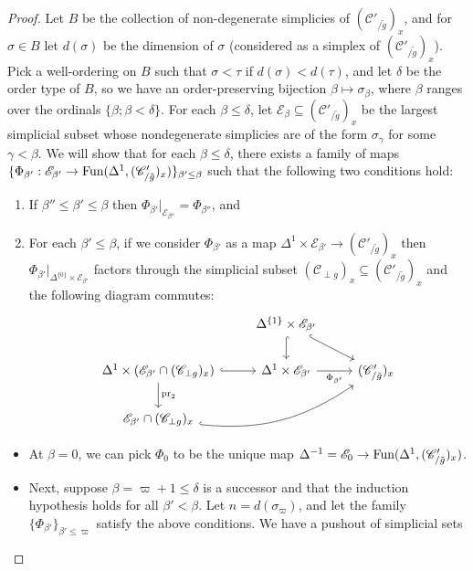 \documentclass{tac}
\newcommand{\s}[1]{\mathscr{#1}}
\newcommand{\tx}[1]{\textnormal{#1}}
\begin{document}
\begin{proof}
\hfill

Let $B$ be the collection of non-degenerate simplicies of $(\s{C}'_{/ \tilde{g}})_x$, and for $\sigma \in B$ let $d(\sigma )$ be the dimension of $\sigma$ (considered as a simplex of  $(\s{C}'_{/ \tilde{g}})_x$).  Pick a well-ordering on $B$ such that $\sigma <\tau$ if $d(\sigma) < d(\tau)$, and let $\delta$ be the order type of $B$, so we have an order-preserving bijection $\beta \mapsto \sigma_\beta$, where $\beta$ ranges over the ordinals $\{\beta ; \beta <\delta \}$.  For each $\beta\leq \delta$, let $\s{E}_\beta \subseteq (\s{C}'_{/ \tilde{g}})_x$ be the largest simplicial subset whose nondegenerate simplicies are of the form $\sigma_{\gamma}$ for some $\gamma < \beta$.  We will show that for each $\beta \leq \delta$, there exists a family of maps $\{ \Phi_{\beta'} : \s{E}_{\beta'} \to \tx{Fun}(\Delta^1 , (\s{C}'_{/ \tilde{g}})_x) \}_{\beta' \leq \beta}$ such that the following two conditions hold: 
\begin{enumerate}[label=\arabic*'.]
\item\label{cohnultriangleprop1prime} If $\beta'' \leq \beta' \leq \beta$ then $\Phi_{\beta'} |_{\s{E}_{\beta''}} = \Phi_{\beta''}$, and 
\item\label{cohnultriangleprop2prime} For each $\beta' \leq \beta$, if we consider $\Phi_{\beta'}$ as a map $\Delta^1 \times \s{E}_{\beta'} \to (\s{C}'_{/\tilde{g}})_x$ then $\Phi_{\beta'} |_{\Delta^{\{0\}} \times \s{E}_{\beta'}}$ factors through the simplicial subset $(\s{C}_{\perp g})_x \subseteq  (\s{C}'_{/\tilde{g}})_x $ and the following diagram commutes:
\begin{equation}\label{cohnultrianglepropdiag2} \begin{tikzcd} &  \Delta^{\{1\}} \times \s{E}_{\beta'} \arrow[hook]{d} \arrow[hook]{dr} & \\
\Delta^1 \times ( \s{E}_{\beta'} \cap (\s{C}_{\perp g})_x) \arrow[hook]{r} \arrow[]{d}{\tx{pr}_2} & \Delta^1 \times \s{E}_{\beta'} \arrow[]{r}[swap]{\Phi_{\beta'}} & (\s{C}'_{/\tilde{g}})_x \\
\s{E}_{\beta'} \cap (\s{C}_{\perp g})_x \arrow[hook, bend right=20]{urr} & &
\end{tikzcd}\end{equation}
\end{enumerate}
\begin{itemize}
\item At $\beta =0$, we can pick $\Phi_0$ to be the unique map $\Delta^{-1} = \s{E}_0 \to  \tx{Fun}(\Delta^1 , (\s{C}'_{/ \tilde{g}})_x)$.
\item Next, suppose $\beta = \varpi +1 \leq \delta$ is a successor and that the induction hypothesis holds for all $\beta' < \beta$.  Let $n=d(\sigma_{\varpi})$, and let the family $\{\Phi_{\beta'} \}_{\beta' \leq \varpi}$ satisfy the above conditions. We have a pushout of simplicial sets

\end{itemize}
\end{proof}
\end{document}
